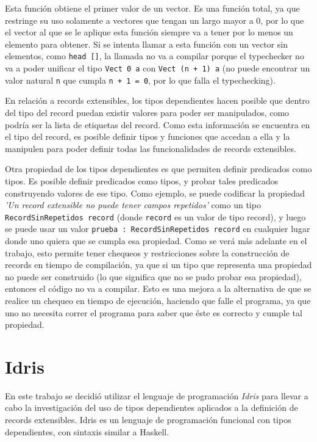 Esta función obtiene el primer valor de un vector. Es una función total, ya que restringe su uso solamente a vectores que tengan un largo mayor a 0, por lo que el vector al que se le aplique esta función siempre va a tener por lo menos un elemento para obtener. Si se intenta llamar a esta función con un vector sin elementos, como \texttt{head []}, la llamada no va a compilar porque el typechecker no va a poder unificar el tipo \texttt{Vect 0 a} con \texttt{Vect (n + 1) a} (no puede encontrar un valor natural \texttt{n} que cumpla \texttt{n + 1 = 0}, por lo que falla el typechecking).

En relación a records extensibles, los tipos dependientes hacen posible que dentro del tipo del record puedan existir valores para poder ser manipulados, como podría ser la lista de etiquetas del record. Como esta información se encuentra en el tipo del record, es posible definir tipos y funciones que accedan a ella y la manipulen para poder definir todas las funcionalidades de records extensibles.

Otra propiedad de los tipos dependientes es que permiten definir predicados como tipos. Es posible definir predicados como tipos, y probar tales predicados construyendo valores de ese tipo. Como ejemplo, se puede codificar la propiedad \textit{'Un record extensible no puede tener campos repetidos'} como un tipo \texttt{RecordSinRepetidos record} (donde \texttt{record} es un valor de tipo record), y luego se puede usar un valor \texttt{prueba : RecordSinRepetidos record} en cualquier lugar donde uno quiera que se cumpla esa propiedad. Como se verá más adelante en el trabajo, esto permite tener chequeos y restricciones sobre la construcción de records en tiempo de compilación, ya que si un tipo que representa una propiedad no puede ser construido (lo que significa que no se pudo probar esa propiedad), entonces el código no va a compilar. Esto es una mejora a la alternativa de que se realice un chequeo en tiempo de ejecución, haciendo que falle el programa, ya que uno no necesita correr el programa para saber que éste es correcto y cumple tal propiedad.

\section{Idris}

En este trabajo se decidió utilizar el lenguaje de programación \textit{Idris} \cite{brady:idris-jfp13} para llevar a cabo la investigación del uso de tipos dependientes aplicados a la definición de records extensibles. Idris es un lenguaje de programación funcional con tipos dependientes, con sintaxis similar a Haskell.

